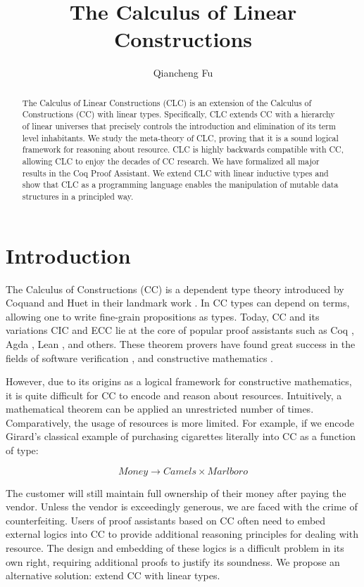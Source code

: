 \documentclass{article}
\title{The Calculus of Linear Constructions}
\author{Qiancheng Fu}
\begin{document}
  \maketitle 
  \begin{abstract}
    The Calculus of Linear Constructions (CLC) is an extension of the Calculus of Constructions (CC) with linear types. Specifically, CLC extends CC with a hierarchy of linear universes that precisely controls the introduction and elimination of its term level inhabitants. We study the meta-theory of CLC, proving that it is a sound logical framework for reasoning about resource. CLC is highly backwards compatible with CC, allowing CLC to enjoy the decades of CC research. We have formalized all major results in the Coq Proof Assistant. We extend CLC with linear inductive types and show that CLC as a programming language enables the manipulation of mutable data structures in a principled way.
  \end{abstract}

  \section{Introduction}
  The Calculus of Constructions (CC) is a dependent type theory introduced by Coquand and Huet in their landmark work \cite{cc}. In CC types can depend on terms, allowing one to write fine-grain propositions as types. Today, CC and its variations CIC \cite{cic} and ECC \cite{ecc} lie at the core of popular proof assistants such as Coq \cite{coq}, Agda \cite{agda}, Lean \cite{lean}, and others. These theorem provers have found great success in the fields of software verification \cite{compcert,deepspec}, and constructive mathematics \cite{four-color,schemes}. 
  
  However, due to its origins as a logical framework for constructive mathematics, it is quite difficult for CC to encode and reason about resources. Intuitively, a mathematical theorem can be applied an unrestricted number of times. Comparatively, the usage of resources is more limited. For example, if we encode Girard's classical example \cite{girard95} of purchasing cigarettes literally into CC as a function of type:

  \begin{equation*}
    Money \rightarrow Camels \times Marlboro
  \end{equation*}

  \noindent The customer will still maintain full ownership of their money after paying the vendor. Unless the vendor is exceedingly generous, we are faced with the crime of counterfeiting. Users of proof assistants based on CC often need to embed external logics into CC \cite{bedrock} to provide additional reasoning principles for dealing with resource. The design and embedding of these logics is a difficult problem in its own right, requiring additional proofs to justify its soundness. We propose an alternative solution: extend CC with linear types.
\end{document}
